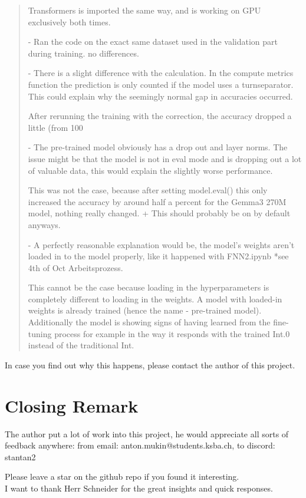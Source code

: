 \documentclass{article}
\begin{document}
\begin{quote}
{Transformers is imported the same way, and is working on GPU exclusively both times.

- Ran the code on the exact same dataset used in the validation part during training. no differences.

- There is a slight difference with the calculation. In the compute metrics function the prediction is only counted if the model uses a turnseparator. This could explain why the seemingly normal gap in accuracies occurred.

After rerunning the training with the correction, the accuracy dropped a little (from 100%

- The pre-trained model obviously has a drop out and layer norms. The issue might be that the model is not in eval mode and is dropping out a lot of valuable data, this would explain the slightly worse performance.

This was not the case, because after setting model.eval() this only increased the accuracy by around half a percent for the Gemma3 270M model, nothing really changed. + This should probably be on by default anyways.

- A perfectly reasonable explanation would be, the model's weights aren't loaded in to the model properly, like it happened with FNN2.ipynb *see 4th of Oct Arbeitsprozess.

This cannot be the case because loading in the hyperparameters is completely different to loading in the weights. A model with loaded-in weights is already trained (hence the name - pre-trained model). Additionally the model is showing signs of having learned from the fine-tuning process for example in the way it responds with the trained Int.0 instead of the traditional Int.
}
\end{quote}
In case you find out why this happens, please contact the author of this 
project.

\newpage
\section{Closing Remark}

The author put a lot of work into this project, he would appreciate all 
sorts of feedback anywhere: from email: anton.mukin@students.ksba.ch, to 
discord: stantan2

Please leave a star on the github repo if you found it interesting.
\\[2em]
I want to thank Herr Schneider for the great insights and quick responses.


\newpage
\printbibliography[heading=bibintoc]
\end{document}
